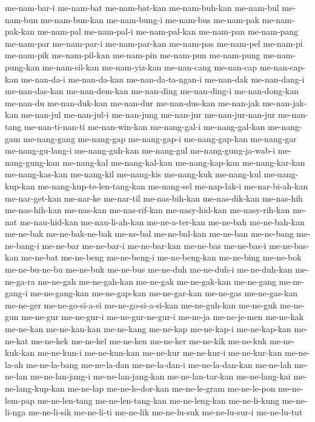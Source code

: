 {me-nam-bar-i me-nam-bat me-nam-bat-kan me-nam-buh-kan me-nam-bul
me-nam-bun me-nam-bun-kan me-nam-bung-i me-nam-bus me-nam-pak
me-nam-pak-kan me-nam-pal me-nam-pal-i me-nam-pal-kan me-nam-pan
me-nam-pang me-nam-par me-nam-par-i me-nam-par-kan me-nam-pas me-nam-pel
me-nam-pi me-nam-pik me-nam-pil-kan me-nam-pin me-nam-pun me-nam-pung
me-nam-pung-kan me-nam-sil-kan me-nam-yiz-kan me-nan-cang me-nan-cap
me-nan-cap-kan me-nan-da-i me-nan-da-kan me-nan-da-ta-ngan-i me-nan-dak
me-nan-dang-i me-nan-das-kan me-nan-dem-kan me-nan-ding me-nan-ding-i
me-nan-dong-kan me-nan-du me-nan-duk-kan me-nan-dur me-nan-dus-kan
me-nan-jak me-nan-jak-kan me-nan-jul me-nan-jul-i me-nan-jung me-nan-jur
me-nan-jur-nan-jur me-nan-tang me-nan-ti-nan-ti me-nan-win-kan
me-nang-gal-i me-nang-gal-kan me-nang-gam me-nang-gang me-nang-gap
me-nang-gap-i me-nang-gap-kan me-nang-gar me-nang-gu-lang-i
me-nang-guh-kan me-nang-gul me-nang-gung-ja-wab-i me-nang-gung-kan
me-nang-kal me-nang-kal-kan me-nang-kap-kan me-nang-kar-kan
me-nang-kas-kan me-nang-kil me-nang-kis me-nang-kuk me-nang-kul
me-nang-kup-kan me-nang-kup-te-len-tang-kan me-nang-sel me-nap-lak-i
me-nar-bi-ah-kan me-nar-get-kan me-nar-ke me-nar-til me-nas-bih-kan
me-nas-dik-kan me-nas-hih me-nas-hih-kan me-nas-kan me-nas-rif-kan
me-nasy-hid-kan me-nasy-rih-kan me-nat me-nau-hid-kan me-nau-li-ah-kan
me-ne-a-ter-kan me-ne-bah me-ne-bah-kan me-ne-bak me-ne-bak-ne-bak
me-ne-bal me-ne-bal-kan me-ne-ban me-ne-bang me-ne-bang-i me-ne-bar
me-ne-bar-i me-ne-bar-kan me-ne-bas me-ne-bas-i me-ne-bas-kan me-ne-bat
me-ne-beng me-ne-beng-i me-ne-beng-kan me-ne-bing me-ne-bok me-ne-bu-ne-bu
me-ne-buk me-ne-bus me-ne-duh me-ne-duh-i me-ne-duh-kan me-ne-ga-ra
me-ne-gah me-ne-gah-kan me-ne-gak me-ne-gak-kan me-ne-gang me-ne-gang-i
me-ne-gang-kan me-ne-gap-kan me-ne-gar-kan me-ne-gas me-ne-gas-kan
me-ne-ger me-ne-go-si-a-si me-ne-go-si-a-si-kan me-ne-guh-kan me-ne-guk
me-ne-gun me-ne-gur me-ne-gur-i me-ne-gur-ne-gur-i me-ne-ja me-ne-je-men
me-ne-kak me-ne-kan me-ne-kan-kan me-ne-kang me-ne-kap me-ne-kap-i
me-ne-kap-kan me-ne-kat me-ne-kek me-ne-kel me-ne-ken me-ne-ker me-ne-kik
me-ne-kuk me-ne-kuk-kan me-ne-kun-i me-ne-kun-kan me-ne-kur me-ne-kur-i
me-ne-kur-kan me-ne-la-ah me-ne-la-bang me-ne-la-dan me-ne-la-dan-i
me-ne-la-dan-kan me-ne-lah me-ne-lan me-ne-lan-jang-i me-ne-lan-jang-kan
me-ne-lan-tar-kan me-ne-lang-kai me-ne-lang-kup-kan me-ne-lap
me-ne-le-dor-kan me-ne-le-gram me-ne-le-pon me-ne-lem-pap me-ne-len-tang
me-ne-len-tang-kan me-ne-leng-kan me-ne-li-kung me-ne-li-nga me-ne-li-sik
me-ne-li-ti me-ne-lik me-ne-lu-suk me-ne-lu-sur-i me-ne-lu-tut
}
